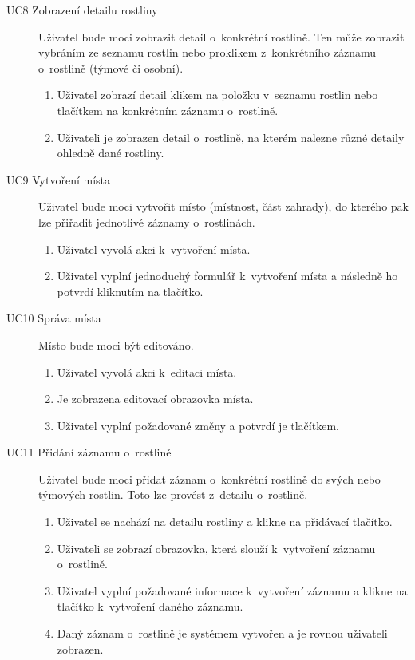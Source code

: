 \documentclass[thesis=M,czech]{FITthesis}[2019/12/23]
\begin{document}
\begin{description}
    \item[UC8 Zobrazení detailu rostliny] Uživatel bude moci zobrazit detail o~konkrétní rostlině. Ten může zobrazit vybráním ze seznamu rostlin nebo proklikem z~konkrétního záznamu o~rostlině (týmové či osobní).
    \begin{enumerate}
        \item Uživatel zobrazí detail klikem na položku v~seznamu rostlin nebo tlačítkem na konkrétním záznamu o~rostlině.
        \item Uživateli je zobrazen detail o~rostlině, na kterém nalezne různé detaily ohledně dané rostliny.
    \end{enumerate}
    
    \item[UC9 Vytvoření místa] Uživatel bude moci vytvořit místo (místnost, část zahrady), do kterého pak lze přiřadit jednotlivé záznamy o~rostlinách.
    \begin{enumerate}
        \item Uživatel vyvolá akci k~vytvoření místa.
        \item Uživatel vyplní jednoduchý formulář k~vytvoření místa a následně ho potvrdí kliknutím na tlačítko.
    \end{enumerate}
    
    \item[UC10 Správa místa] Místo bude moci být editováno.
    \begin{enumerate}
        \item Uživatel vyvolá akci k~editaci místa.
        \item Je zobrazena editovací obrazovka místa.
        \item Uživatel vyplní požadované změny a potvrdí je tlačítkem.
    \end{enumerate}

    \item[UC11 Přidání záznamu o~rostlině] Uživatel bude moci přidat záznam o~konkrétní rostlině do svých nebo týmových rostlin. Toto lze provést z~detailu o~rostlině.
    \begin{enumerate}
        \item Uživatel se nachází na detailu rostliny a klikne na přidávací tlačítko.
        \item Uživateli se zobrazí obrazovka, která slouží k~vytvoření záznamu o~rostlině.
        \item Uživatel vyplní požadované informace k~vytvoření záznamu a klikne na tlačítko k~vytvoření daného záznamu.
        \item Daný záznam o~rostlině je systémem vytvořen a je rovnou uživateli zobrazen.
    \end{enumerate}
    

\end{description}
\end{document}
